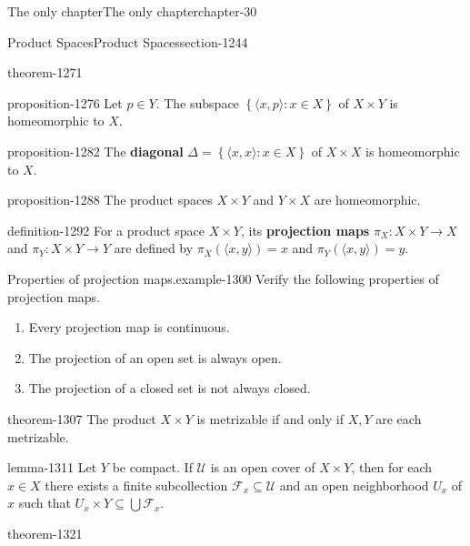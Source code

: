 \documentclass[oneside,10pt,]{book}
\newcommand{\terminology}[1]{\textbf{#1}}
\newcommand{\tuple}[1]{\langle #1 \rangle}
\newcommand{\mc}{\mathcal}
\newcommand{\setBuilder}[2]{\left\{#1:#2\right\}}
\begin{document}
\begin{chapterptx}{The only chapter}{}{The only chapter}{}{}{chapter-30}
\begin{sectionptx}{Product Spaces}{}{Product Spaces}{}{}{section-1244}
\begin{theorem}{}{}{theorem-1271}
\end{theorem}
\begin{proposition}{}{}{proposition-1276}%
\hypertarget{p-1277}{}%
Let \(p\in Y\). The subspace \(\setBuilder{\tuple{x,p}}{x\in X}\) of \(X\times Y\) is homeomorphic to \(X\).%
\end{proposition}
\begin{proposition}{}{}{proposition-1282}%
\hypertarget{p-1283}{}%
The \terminology{diagonal} \(\Delta=\setBuilder{\tuple{x,x}}{x\in X}\) of \(X\times X\) is homeomorphic to \(X\).%
\end{proposition}
\begin{proposition}{}{}{proposition-1288}%
\hypertarget{p-1289}{}%
The product spaces \(X\times Y\) and \(Y\times X\) are homeomorphic.%
\end{proposition}
\begin{definition}{}{definition-1292}%
\hypertarget{p-1293}{}%
For a product space \(X\times Y\), its \terminology{projection maps} \(\pi_X:X\times Y\to X\) and \(\pi_Y:X\times Y\to Y\) are defined by \(\pi_X(\tuple{x,y})=x\) and \(\pi_Y(\tuple{x,y})=y\).%
\end{definition}
\begin{example}{Properties of projection maps.}{example-1300}%
\hypertarget{p-1302}{}%
Verify the following properties of projection maps.%
\leavevmode%
\begin{enumerate}
\item\hypertarget{li-1304}{}Every projection map is continuous.%
\item\hypertarget{li-1305}{}The projection of an open set is always open.%
\item\hypertarget{li-1306}{}The projection of a closed set is not always closed.%
\end{enumerate}
\end{example}
\begin{theorem}{}{}{theorem-1307}%
\hypertarget{p-1308}{}%
The product \(X\times Y\) is metrizable if and only if \(X,Y\) are each metrizable.%
\end{theorem}
\begin{lemma}{}{}{lemma-1311}%
\hypertarget{p-1312}{}%
Let \(Y\) be compact. If \(\mc U\) is an open cover of \(X\times Y\), then for each \(x\in X\) there exists a finite subcollection \(\mc F_x\subseteq\mc U\) and an open neighborhood \(U_x\) of \(x\) such that \(U_x\times Y\subseteq\bigcup\mc F_x\).%
\end{lemma}
\begin{theorem}{}{}{theorem-1321}%

\end{theorem}
\end{sectionptx}
\end{chapterptx}
\end{document}

